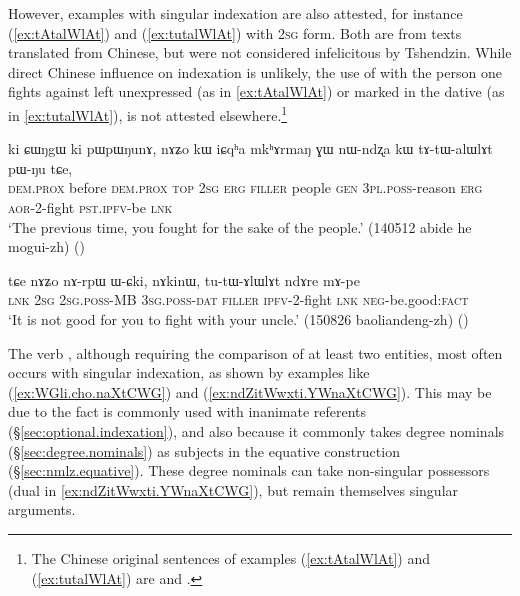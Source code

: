 However, examples with singular indexation are also attested, for instance (\ref{ex:tAtalWlAt}) and (\ref{ex:tutalWlAt}) with \textsc{2sg} form. Both are from texts translated from Chinese, but were not considered infelicitous by Tshendzin. While direct Chinese influence on indexation is unlikely, the use of  with the person one fights against left unexpressed (as in \ref{ex:tAtalWlAt}) or marked in the dative (as in \ref{ex:tutalWlAt}), is not attested elsewhere.\footnote{The Chinese original sentences of examples (\ref{ex:tAtalWlAt}) and (\ref{ex:tutalWlAt}) are  and .  } 

\begin{exe}
\ex   \label{ex:tAtalWlAt}
 \gll  ki ɕɯŋgɯ ki pɯpɯŋunɤ, nɤʑo kɯ iɕqʰa mkʰɤrmaŋ ɣɯ nɯ-ndʐa kɯ tɤ-tɯ-alɯlɤt pɯ-ŋu tɕe, \\
 \textsc{dem}.\textsc{prox} before \textsc{dem}.\textsc{prox} \textsc{top} \textsc{2sg} \textsc{erg} \textsc{filler} people \textsc{gen} \textsc{3pl}.\textsc{poss}-reason \textsc{erg} \textsc{aor}-2-fight \textsc{pst}.\textsc{ipfv}-be \textsc{lnk} \\
\glt `The previous time, you fought for the sake of the people.' (140512 abide he mogui-zh)
()
 \end{exe}

\begin{exe}
\ex   \label{ex:tutalWlAt}
 \gll  tɕe nɤʑo nɤ-rpɯ ɯ-ɕki, nɤkinɯ, tu-tɯ-ɤlɯlɤt ndɤre mɤ-pe \\
 \textsc{lnk} \textsc{2sg} \textsc{2sg}.\textsc{poss}-MB \textsc{3sg}.\textsc{poss}-\textsc{dat} \textsc{filler} \textsc{ipfv}-2-fight \textsc{lnk} \textsc{neg}-be.good:\textsc{fact} \\
 \glt `It is not good for you to fight with your uncle.' (150826 baoliandeng-zh)
()
  \end{exe}
  
The verb , although requiring the comparison of at least two entities, most often occurs with singular indexation, as shown by examples like (\ref{ex:WGli.cho.naXtCWG}) and (\ref{ex:ndZitWwxti.YWnaXtCWG}). This may be due to the fact  is commonly used with inanimate referents (§\ref{sec:optional.indexation}), and also because it commonly takes degree nominals  (§\ref{sec:degree.nominals}) as subjects in the equative construction (§\ref{sec:nmlz.equative}). These degree nominals can take non-singular possessors (dual in \ref{ex:ndZitWwxti.YWnaXtCWG}), but remain themselves singular arguments.

